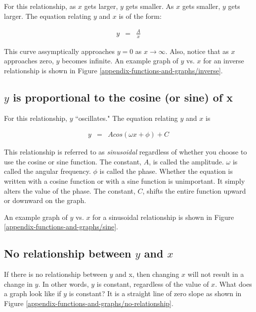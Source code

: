 For this relationship, as $x$ gets larger, $y$ gets smaller.  As $x$ gets smaller, $y$ gets larger.  The equation relating $y$ and $x$ is of the form:

\begin{eqnarray*}
	 y & = &  \frac{A}{x}
\end{eqnarray*}	 

This curve assymptically approaches $y=0$ as $x\to\infty$.  Also, notice that as $x$ approaches zero, $y$ becomes infinite. An example graph of $y$ vs. $x$ for an inverse relationship is shown in Figure \ref{appendix-functions-and-graphs/inverse}.


\newpage

\subsection*{$y$ is proportional to the cosine (or sine) of x}

For this relationship, $y$ ``oscillates."  The equation relating $y$ and $x$ is

\begin{eqnarray*}
	 y & = &  Acos(\omega x + \phi) + C
\end{eqnarray*}	 

This relationship is referred to as \emph{sinusoidal} regardless of whether you choose to use the cosine or sine function. The constant, $A$, is called the amplitude.  $\omega$ is called the angular frequency. $\phi$ is called the phase.  Whether the equation is written with a cosine function or with a sine function is unimportant. It simply alters the value of the phase. The constant, $C$, shifts the entire function upward or downward on the graph.

An example graph of $y$ vs. $x$ for a sinusoidal relationship is shown in Figure \ref{appendix-functions-and-graphs/sine}.



\subsection*{No relationship between $y$ and $x$}

If there is no relationship between $y$ and x, then changing $x$ will not result in a change in $y$.  In other words, $y$ is constant, regardless of the value of $x$.  What does a graph look like if $y$ is constant?  It is a straight line of zero slope as shown in Figure \ref{appendix-functions-and-graphs/no-relationship}.



